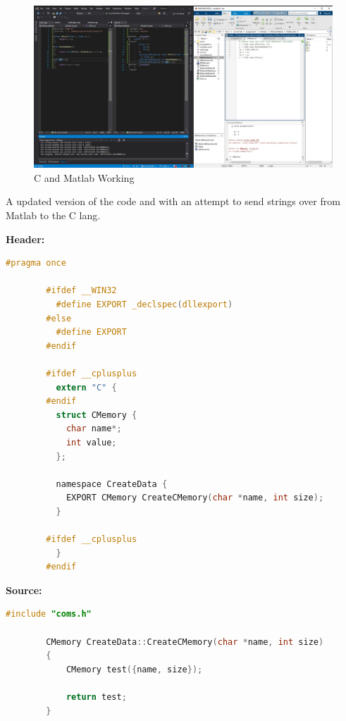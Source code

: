 \documentclass[conference]{IEEEtran}
\begin{document}
      \begin{figure}[ht]
        \centering
        \includegraphics[width=1\columnwidth]{Figures/fig1.jpg}
        \caption{C and Matlab Working}
        \label{fig:throughput}
      \end{figure}

      A updated version of the code and with an attempt to send strings over from Matlab to the C lang.

      \textbf{Header:}
      \begin{lstlisting}[language=c]
        #pragma once

        #ifdef __WIN32
          #define EXPORT _declspec(dllexport)
        #else
          #define EXPORT
        #endif

        #ifdef __cplusplus
          extern "C" {
        #endif
          struct CMemory {
            char name*;
            int value;
          };

          namespace CreateData {
            EXPORT CMemory CreateCMemory(char *name, int size);
          }

        #ifdef __cplusplus
          }
        #endif
      \end{lstlisting}

      \textbf{Source:}
      \begin{lstlisting}[language=c++]
        #include "coms.h"

        CMemory CreateData::CreateCMemory(char *name, int size)
        {
            CMemory test({name, size});

            return test;
        }
      \end{lstlisting}
  \nocite{*}
	\renewcommand\refname{\section{Reference List}}
	\small{
    }
\end{document}
